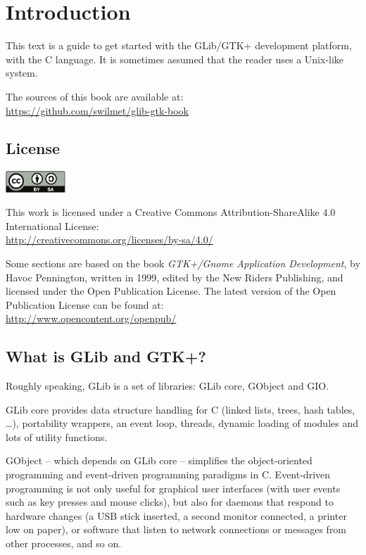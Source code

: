 \chapter{Introduction}

This text is a guide to get started with the GLib/GTK+ development platform, with the C language. It is sometimes assumed that the reader uses a Unix-like system.

The sources of this book are available at:\\
\url{https://github.com/swilmet/glib-gtk-book}

\section{License}
\label{intro-license}

\begin{center}
  \includegraphics[height=0.8cm]{images/creative-commons.pdf}
\end{center}

This work is licensed under a Creative Commons Attribution-ShareAlike 4.0 International License:\\
\url{http://creativecommons.org/licenses/by-sa/4.0/}

Some sections are based on the book \emph{GTK+/Gnome Application Development}, by Havoc Pennington, written in 1999, edited by the New Riders Publishing, and licensed under the Open Publication License. The latest version of the Open Publication License can be found at:\\
\url{http://www.opencontent.org/openpub/}

\section{What is GLib and GTK+?}

Roughly speaking, GLib is a set of libraries: GLib core, GObject and GIO.

GLib core provides data structure handling for C (linked lists, trees, hash tables, …), portability wrappers, an event loop, threads, dynamic loading of modules and lots of utility functions.

GObject -- which depends on GLib core -- simplifies the object-oriented programming and event-driven programming paradigms in C. Event-driven programming is not only useful for graphical user interfaces (with user events such as key presses and mouse clicks), but also for daemons that respond to hardware changes (a USB stick inserted, a second monitor connected, a printer low on paper), or software that listen to network connections or messages from other processes, and so on.

